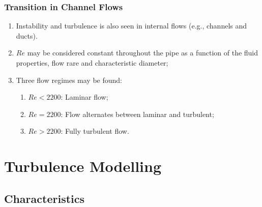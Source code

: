 \documentclass[10pt,compress]{beamer}
\begin{document}
\begin{frame}
 \frametitle{Transition in Channel Flows}
     \begin{enumerate}%
        \item<1-> Instability and turbulence is also seen in internal flows (e.g., channels and ducts).
        \item<1-> $Re$ may be considered constant throughout the pipe as a function of the fluid properties, flow rare and characteristic diameter;
        \item<2-> Three flow regimes may be found:
            \begin{enumerate}
                \item<2-> $Re < 2200$: Laminar flow;
                \item<2-> $Re = 2200$: Flow alternates between laminar and turbulent;
                \item<2-> $Re > 2200$: Fully turbulent flow.
            \end{enumerate}
       \end{enumerate}

\end{frame}

\section{Turbulence Modelling}

\subsection{Characteristics}
\end{document}
